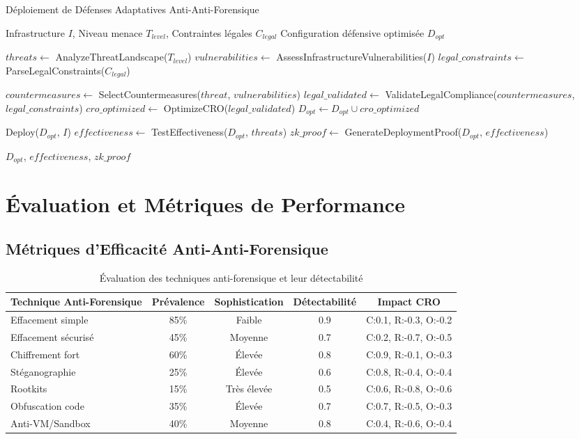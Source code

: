 \begin{algorithm}
\caption{Déploiement de Défenses Adaptatives Anti-Anti-Forensique}
\begin{algorithmic}[1]
\REQUIRE Infrastructure $I$, Niveau menace $T_{level}$, Contraintes légales $C_{legal}$
\ENSURE Configuration défensive optimisée $D_{opt}$

\STATE $threats \leftarrow$ AnalyzeThreatLandscape($T_{level}$)
\STATE $vulnerabilities \leftarrow$ AssessInfrastructureVulnerabilities($I$)
\STATE $legal\_constraints \leftarrow$ ParseLegalConstraints($C_{legal}$)

    \STATE $countermeasures \leftarrow$ SelectCountermeasures($threat$, $vulnerabilities$)
    \STATE $legal\_validated \leftarrow$ ValidateLegalCompliance($countermeasures$, $legal\_constraints$)
    \STATE $cro\_optimized \leftarrow$ OptimizeCRO($legal\_validated$)
    \STATE $D_{opt} \leftarrow D_{opt} \cup cro\_optimized$
\ENDFOR

\STATE Deploy($D_{opt}$, $I$)
\STATE $effectiveness \leftarrow$ TestEffectiveness($D_{opt}$, $threats$)
\STATE $zk\_proof \leftarrow$ GenerateDeploymentProof($D_{opt}$, $effectiveness$)

\RETURN $D_{opt}$, $effectiveness$, $zk\_proof$
\end{algorithmic}
\end{algorithm}

\section{Évaluation et Métriques de Performance}

\subsection{Métriques d'Efficacité Anti-Anti-Forensique}

\begin{table}[h]
\centering
\begin{tabular}{|l|c|c|c|c|}
\hline
\textbf{Technique Anti-Forensique} & \textbf{Prévalence} & \textbf{Sophistication} & \textbf{Détectabilité} & \textbf{Impact CRO} \\
\hline
Effacement simple & 85\% & Faible & 0.9 & C:0.1, R:-0.3, O:-0.2 \\
Effacement sécurisé & 45\% & Moyenne & 0.7 & C:0.2, R:-0.7, O:-0.5 \\
Chiffrement fort & 60\% & Élevée & 0.8 & C:0.9, R:-0.1, O:-0.3 \\
Stéganographie & 25\% & Élevée & 0.6 & C:0.8, R:-0.4, O:-0.4 \\
Rootkits & 15\% & Très élevée & 0.5 & C:0.6, R:-0.8, O:-0.6 \\
Obfuscation code & 35\% & Élevée & 0.7 & C:0.7, R:-0.5, O:-0.3 \\
Anti-VM/Sandbox & 40\% & Moyenne & 0.8 & C:0.4, R:-0.6, O:-0.4 \\
\hline
\end{tabular}
\caption{Évaluation des techniques anti-forensique et leur détectabilité}
\end{table}

